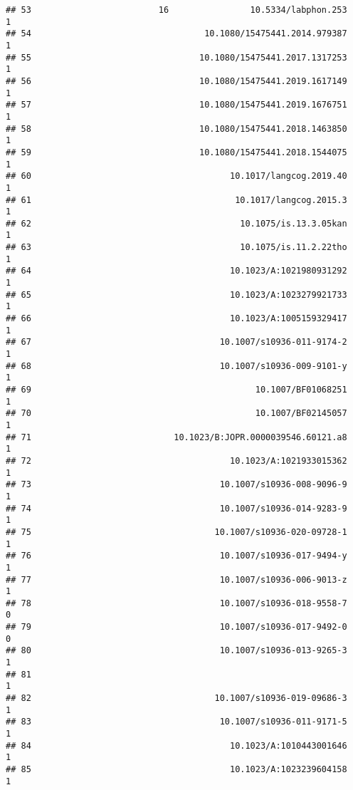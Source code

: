 \documentclass[
  english,
  man]{apa6}
\begin{document}
\begin{verbatim}
## 53                         16                10.5334/labphon.253            1
## 54                                  10.1080/15475441.2014.979387            1
## 55                                 10.1080/15475441.2017.1317253            1
## 56                                 10.1080/15475441.2019.1617149            1
## 57                                 10.1080/15475441.2019.1676751            1
## 58                                 10.1080/15475441.2018.1463850            1
## 59                                 10.1080/15475441.2018.1544075            1
## 60                                       10.1017/langcog.2019.40            1
## 61                                        10.1017/langcog.2015.3            1
## 62                                         10.1075/is.13.3.05kan            1
## 63                                         10.1075/is.11.2.22tho            1
## 64                                       10.1023/A:1021980931292            1
## 65                                       10.1023/A:1023279921733            1
## 66                                       10.1023/A:1005159329417            1
## 67                                     10.1007/s10936-011-9174-2            1
## 68                                     10.1007/s10936-009-9101-y            1
## 69                                            10.1007/BF01068251            1
## 70                                            10.1007/BF02145057            1
## 71                            10.1023/B:JOPR.0000039546.60121.a8            1
## 72                                       10.1023/A:1021933015362            1
## 73                                     10.1007/s10936-008-9096-9            1
## 74                                     10.1007/s10936-014-9283-9            1
## 75                                    10.1007/s10936-020-09728-1            1
## 76                                     10.1007/s10936-017-9494-y            1
## 77                                     10.1007/s10936-006-9013-z            1
## 78                                     10.1007/s10936-018-9558-7            0
## 79                                     10.1007/s10936-017-9492-0            0
## 80                                     10.1007/s10936-013-9265-3            1
## 81                                                                          1
## 82                                    10.1007/s10936-019-09686-3            1
## 83                                     10.1007/s10936-011-9171-5            1
## 84                                       10.1023/A:1010443001646            1
## 85                                       10.1023/A:1023239604158            1

\end{verbatim}
\end{document}
